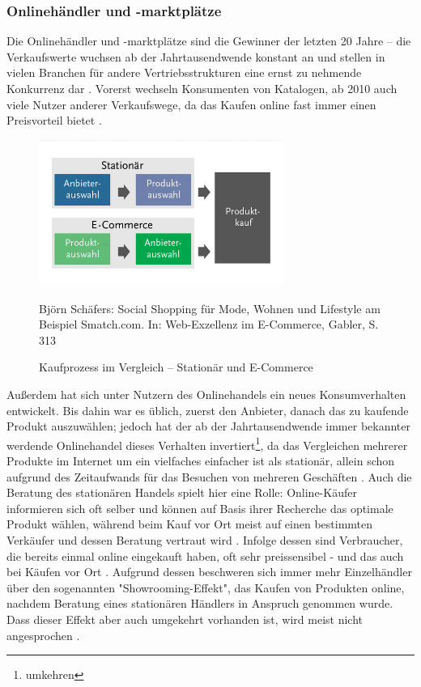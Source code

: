 \begin{folding} \subsubsection{Onlinehändler und -marktplätze}

Die Onlinehändler und -marktplätze sind die Gewinner der letzten 20 Jahre – die Verkaufswerte wuchsen ab der Jahrtausendwende konstant an und stellen in vielen Branchen für andere Vertriebsstrukturen eine ernst zu nehmende Konkurrenz dar \cite{wolf}. Vorerst wechseln Konsumenten von Katalogen, ab 2010 auch viele Nutzer anderer Verkaufswege, da das Kaufen online fast immer einen Preisvorteil bietet \cite[S. 31]{Graf}.
\begin{figure}[h]
    \begin{center}
        \includegraphics[width=8cm]{media/Fabian-konsumwandel.png}
        \caption{Kaufprozess im Vergleich – Stationär und E-Commerce}
        \label{konsumwandel}
        \bildquelle Björn Schäfers: Social Shopping für Mode, Wohnen und Lifestyle am Beispiel Smatch.com. In: Web-Exzellenz im E-Commerce, Gabler, S. 313 %
    \end{center}
\end{figure} 
Außerdem hat sich unter Nutzern des Onlinehandels ein neues Konsumverhalten entwickelt. Bis dahin war es üblich, zuerst den Anbieter, danach das zu kaufende Produkt auszuwählen; jedoch hat der ab der Jahrtausendwende immer bekannter werdende Onlinehandel dieses Verhalten invertiert\footnote{umkehren}, da das Vergleichen mehrerer Produkte im Internet um ein vielfaches einfacher ist als stationär, allein schon aufgrund des Zeitaufwands für das Besuchen von mehreren Geschäften \cite[S 22f]{Graf}. Auch die Beratung des stationären Handels spielt hier eine Rolle: Online-Käufer informieren sich oft selber und können auf Basis ihrer Recherche das optimale Produkt wählen, während beim Kauf vor Ort meist auf einen bestimmten Verkäufer und dessen Beratung vertraut wird \cite[S. 15f]{evilcom}. Infolge dessen sind Verbraucher, die bereits einmal online eingekauft haben, oft sehr preissensibel - und das auch bei Käufen vor Ort \cite[S. 60]{Nitt}. Aufgrund dessen beschweren sich immer mehr Einzelhändler über den sogenannten "Showrooming-Effekt", das Kaufen von Produkten online, nachdem Beratung eines stationären Händlers in Anspruch genommen wurde. Dass dieser Effekt aber auch umgekehrt vorhanden ist, wird meist nicht angesprochen \cite[S. 21f]{evilcom}.

\end{folding}
